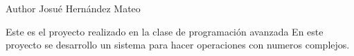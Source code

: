 \begin{DoxyAuthor}{Author}
Josué Hernández Mateo
\end{DoxyAuthor}
Este es el proyecto realizado en la clase de programación avanzada En este proyecto se desarrollo un sistema para hacer operaciones con numeros complejos. 